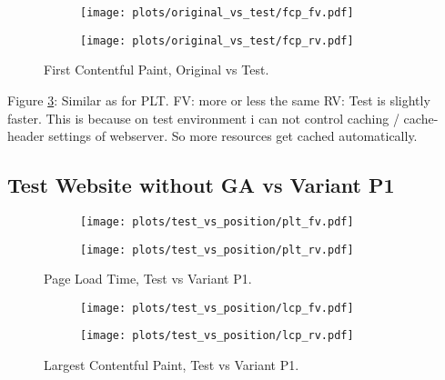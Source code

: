 \begin{figure}
	\centering
	\begin{subfigure}{.5\textwidth}
		\centering
		\texttt{[image: plots/original\_vs\_test/fcp\_fv.pdf]}
		\label{fig:sub1}
	\end{subfigure}%
	\begin{subfigure}{.5\textwidth}
		\centering
		\texttt{[image: plots/original\_vs\_test/fcp\_rv.pdf]}
		\label{fig:sub2}
	\end{subfigure}
	\caption{First Contentful Paint, Original vs Test.}
	\label{figure:fcp_original_test}
\end{figure}

Figure \ref{figure:fcp_original_test}:
Similar as for PLT.
FV: more or less the same
RV: Test is slightly faster. This is because on test environment i can not control caching / cache-header settings of webserver. So more resources get cached automatically.









\subsection{Test Website without GA vs Variant P1}



\begin{figure}
	\centering
	\begin{subfigure}{.5\textwidth}
		\centering
		\texttt{[image: plots/test\_vs\_position/plt\_fv.pdf]}
		\label{fig:sub1}
	\end{subfigure}%
	\begin{subfigure}{.5\textwidth}
		\centering
		\texttt{[image: plots/test\_vs\_position/plt\_rv.pdf]}
		\label{fig:sub2}
	\end{subfigure}
	\caption{Page Load Time, Test vs Variant P1.}
	\label{figure:plt_original_test}
\end{figure}



\begin{figure}
	\centering
	\begin{subfigure}{.5\textwidth}
		\centering
		\texttt{[image: plots/test\_vs\_position/lcp\_fv.pdf]}
		\label{fig:sub1}
	\end{subfigure}%
	\begin{subfigure}{.5\textwidth}
		\centering
		\texttt{[image: plots/test\_vs\_position/lcp\_rv.pdf]}
		\label{fig:sub2}
	\end{subfigure}
	\caption{Largest Contentful Paint, Test vs Variant P1.}
	\label{figure:plt_original_test}
\end{figure}





